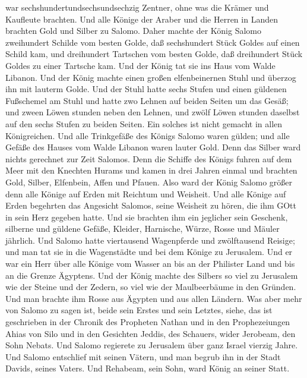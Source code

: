 war sechshundertundsechsundsechzig Zentner,  ohne was die
Krämer und Kaufleute brachten. Und alle Könige der Araber und die Herren
in Landen brachten Gold und Silber zu Salomo.  Daher machte
der König Salomo zweihundert Schilde vom besten Golde, daß sechshundert
Stück Goldes auf einen Schild kam,  und dreihundert
Tartschen vom besten Golde, daß dreihundert Stück Goldes zu einer
Tartsche kam.  Und der König tat sie ins Haus vom Walde
Libanon. Und der König machte einen großen elfenbeinernen Stuhl und
überzog ihn mit lauterm Golde.  Und der Stuhl hatte sechs
Stufen und einen güldenen Fußschemel am Stuhl und hatte zwo Lehnen auf
beiden Seiten um das Gesäß; und zween Löwen stunden neben den Lehnen,
 und zwölf Löwen stunden daselbst auf den sechs Stufen zu
beiden Seiten. Ein solches ist nicht gemacht in allen Königreichen.
 Und alle Trinkgefäße des Königs Salomo waren gülden; und
alle Gefäße des Hauses vom Walde Libanon waren lauter Gold. Denn das
Silber ward nichts gerechnet zur Zeit Salomos.  Denn die
Schiffe des Königs fuhren auf dem Meer mit den Knechten Hurams und kamen
in drei Jahren einmal und brachten Gold, Silber, Elfenbein, Affen und
Pfauen.  Also ward der König Salomo größer denn alle Könige
auf Erden mit Reichtum und Weisheit.  Und alle Könige auf
Erden begehrten das Angesicht Salomos, seine Weisheit zu hören, die ihm
GOtt in sein Herz gegeben hatte.  Und sie brachten ihm ein
jeglicher sein Geschenk, silberne und güldene Gefäße, Kleider,
Harnische, Würze, Rosse und Mäuler jährlich.  Und Salomo
hatte viertausend Wagenpferde und zwölftausend Reisige; und man tat sie
in die Wagenstädte und bei dem Könige zu Jerusalem.  Und er
war ein Herr über alle Könige vom Wasser an bis an der Philister Land
und bis an die Grenze Ägyptens.  Und der König machte des
Silbers so viel zu Jerusalem wie der Steine und der Zedern, so viel wie
der Maulbeerbäume in den Gründen.  Und man brachte ihm
Rosse aus Ägypten und aus allen Ländern.  Was aber mehr von
Salomo zu sagen ist, beide sein Erstes und sein Letztes, siehe, das ist
geschrieben in der Chronik des Propheten Nathan und in den
Prophezeiungen Ahias von Silo und in den Gesichten Jeddis, des Schauers,
wider Jerobeam, den Sohn Nebats.  Und Salomo regierete zu
Jerusalem über ganz Israel vierzig Jahre.  Und Salomo
entschlief mit seinen Vätern, und man begrub ihn in der Stadt Davids,
seines Vaters. Und Rehabeam, sein Sohn, ward König an seiner Statt.

